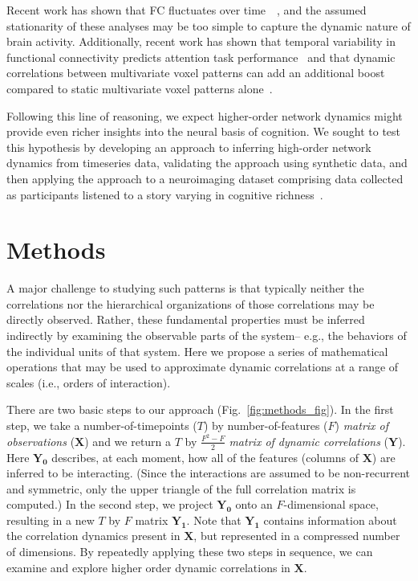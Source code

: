 \documentclass[english]{article}
\begin{document}
Recent work has shown that FC fluctuates over time~\citep{ChanGlov10}~\citep[for review]{LuriEtal19}, and the assumed stationarity of these analyses may be too
simple to capture the dynamic nature of brain activity.  Additionally,
recent work has shown that temporal
variability in functional connectivity predicts attention task
performance~\citep{FongEtal18} and that
dynamic correlations between multivariate voxel patterns can add an
additional boost compared to static multivariate voxel patterns alone~\citep{MannEtal18}.

Following this line of reasoning, we expect higher-order network
dynamics might provide even richer insights into the neural basis of
cognition. We sought to test this hypothesis by developing an approach
to inferring high-order network dynamics from timeseries data,
validating the approach using synthetic data, and then applying the approach to
a neuroimaging dataset comprising data collected as participants
listened to a story varying in cognitive richness~\citep{SimoEtal16}. 

\section*{Methods}
A major challenge to studying such patterns is that typically neither
the correlations nor the hierarchical organizations of those
correlations may be directly observed.  Rather, these fundamental
properties must be inferred indirectly by examining the observable
parts of the system-- e.g., the behaviors of the individual units of
that system.  Here we propose a series of mathematical operations that may be used to approximate dynamic correlations at a range of scales (i.e., orders of interaction).

There are two basic steps to our approach (Fig.~\ref{fig:methods_fig}).  In the first step, we take
a number-of-timepoints ($T$) by number-of-features ($F$)
\textit{matrix of observations} ($\mathbf{X}$) and we return a $T$ by
$\frac{F^2 - F}{2}$ \textit{matrix of dynamic correlations}
($\mathbf{Y}$).  Here $\mathbf{Y_0}$ describes, at each moment, how
all of the features (columns of $\mathbf{X}$) are inferred to be
interacting.  (Since the interactions are assumed to be non-recurrent
and symmetric, only the upper triangle of the full correlation matrix
is computed.)  In the second step, we project $\mathbf{Y_0}$ onto an
$F$-dimensional space, resulting in a new $T$ by $F$ matrix
$\mathbf{Y_1}$.  Note that $\mathbf{Y_1}$ contains information about
the correlation dynamics present in $\mathbf{X}$, but represented in a
compressed number of dimensions.  By repeatedly applying these two
steps in sequence, we can examine and explore higher order dynamic
correlations in $\mathbf{X}$.
\end{document}

